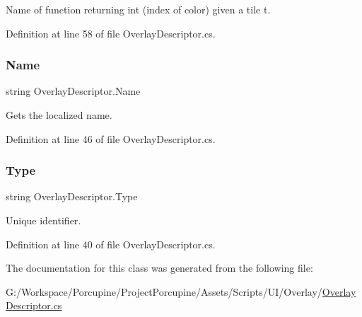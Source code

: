 Name of function returning int (index of color) given a tile t. 



Definition at line 58 of file Overlay\+Descriptor.\+cs.

\mbox{\label{class_overlay_descriptor_aa49f263dd8fbf9ed36f031f2bacc5815}} 
\subsubsection{\texorpdfstring{Name}{Name}}
{\footnotesize\ttfamily string Overlay\+Descriptor.\+Name\hspace{0.3cm}{\ttfamily [get]}}



Gets the localized name. 



Definition at line 46 of file Overlay\+Descriptor.\+cs.

\mbox{\label{class_overlay_descriptor_a5d9bc37e7dbea883b6e3f2905641a34a}} 
\subsubsection{\texorpdfstring{Type}{Type}}
{\footnotesize\ttfamily string Overlay\+Descriptor.\+Type\hspace{0.3cm}{\ttfamily [get]}}



Unique identifier. 



Definition at line 40 of file Overlay\+Descriptor.\+cs.



The documentation for this class was generated from the following file\+:\begin{DoxyCompactItemize}
\item 
G\+:/\+Workspace/\+Porcupine/\+Project\+Porcupine/\+Assets/\+Scripts/\+U\+I/\+Overlay/\hyperlink{_overlay_descriptor_8cs}{Overlay\+Descriptor.\+cs}\end{DoxyCompactItemize}
